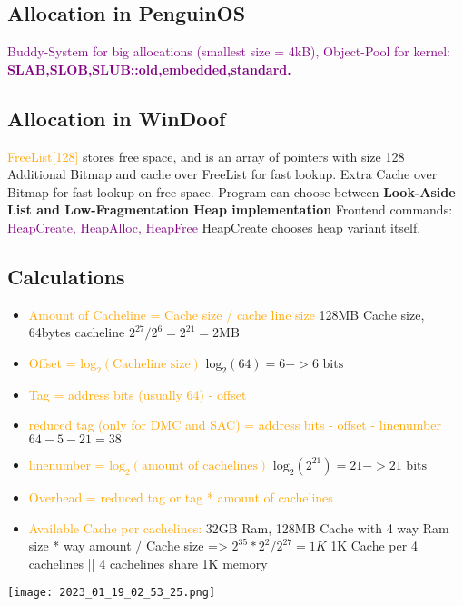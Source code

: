 \documentclass[main.tex,fontsize=7pt,paper=a4,paper=landscape,DIV=calc,]{scrartcl}
\begin{document}
\begin{multicols*}{4}
\subsection{Allocation in PenguinOS}
\textcolor{purple}{Buddy-System for big allocations (smallest size = 4kB), Object-Pool for kernel: \newline 
\textbf{SLAB,SLOB,SLUB::old,embedded,standard.}}

\subsection{Allocation in WinDoof}
\textcolor{orange}{FreeList[128]} stores free space, and is an array of pointers with size 128\newline
Additional Bitmap and cache over FreeList for fast lookup.\newline
Extra Cache over Bitmap for fast lookup on free space.\newline
Program can choose between \textbf{Look-Aside List and Low-Fragmentation Heap implementation}\newline
Frontend commands: \textcolor{purple}{HeapCreate, HeapAlloc, HeapFree}\newline
HeapCreate chooses heap variant itself.

\subsection{Calculations}
\begin{itemize}
\item \textcolor{orange}{Amount of Cacheline = Cache size / cache line size}\newline
  128MB Cache size, 64bytes cacheline \( 2^27 / 2^6 = 2^21 = 2\text{MB} \)
\item \textcolor{orange}{Offset = \(\text{log}_2(\text{Cacheline size})\)}\newline
  \( \text{log}_2(64) = 6 -> \text{6 bits} \)
\item \textcolor{orange}{Tag = address bits (usually 64) - offset}
\item \textcolor{orange}{reduced tag (only for DMC and SAC) = address bits - offset - linenumber}\newline
  \( 64 - 5 - 21 = 38 \)
\item \textcolor{orange}{linenumber = \(\text{log}_2(\text{amount of cachelines})\)}\newline
  \( \text{log}_2(2^21) = 21 -> \text{21 bits} \)
\item \textcolor{orange}{Overhead = reduced tag or tag * amount of cachelines}\newline
\item  \textcolor{orange}{Available Cache per cachelines:}\newline
  32GB Ram, 128MB Cache with 4 way \newline
  Ram size * way amount / Cache size => \( 2^35 * 2^2 / 2^27 = 1K \)\newline
  1K Cache per 4 cachelines || 4 cachelines share 1K memory
\end{itemize} 
\texttt{[image: 2023\_01\_19\_02\_53\_25.png]}



\end{multicols*}
\end{document}
